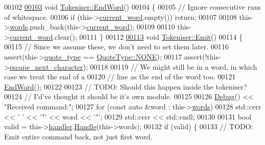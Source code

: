 \begin{DoxyCode}
00102 
\hypertarget{tokeniser_8cpp_source_l00103}{}\hyperlink{classTokeniser_abb18309e5b6cce8fc63cdb4b02e69bf3}{00103} \textcolor{keywordtype}{void} \hyperlink{classTokeniser_abb18309e5b6cce8fc63cdb4b02e69bf3}{Tokeniser::EndWord}()
00104 \{
00105     \textcolor{comment}{// Ignore consecutive runs of whitespace.}
00106     \textcolor{keywordflow}{if} (this->\hyperlink{classTokeniser_a5d703e64476ccc8cbf42cc7c3ef8bc79}{current\_word}.empty()) \textcolor{keywordflow}{return};
00107 
00108     this->\hyperlink{classTokeniser_ac87e935ecd591ec802e223ec341ebbfb}{words}.push\_back(this->\hyperlink{classTokeniser_a5d703e64476ccc8cbf42cc7c3ef8bc79}{current\_word});
00109 
00110     this->\hyperlink{classTokeniser_a5d703e64476ccc8cbf42cc7c3ef8bc79}{current\_word}.clear();
00111 \}
00112 
\hypertarget{tokeniser_8cpp_source_l00113}{}\hyperlink{classTokeniser_a71405521b0e9c00a0d9b1a2f32ae10c2}{00113} \textcolor{keywordtype}{void} \hyperlink{classTokeniser_a71405521b0e9c00a0d9b1a2f32ae10c2}{Tokeniser::Emit}()
00114 \{
00115     \textcolor{comment}{// Since we assume these, we don't need to set them later.}
00116     assert(this->\hyperlink{classTokeniser_a10b7147e055edd438fcb951fc41faf65}{quote\_type} == \hyperlink{classTokeniser_a71d622e60fae9d6c36c96ba69a4f62e4ab50339a10e1de285ac99d4c3990b8693}{QuoteType::NONE});
00117     assert(!this->\hyperlink{classTokeniser_ace181afc0f1425b87126becc79458edd}{escape\_next\_character});
00118 
00119     \textcolor{comment}{// We might still be in a word, in which case we treat the end of a}
00120     \textcolor{comment}{// line as the end of the word too.}
00121     \hyperlink{classTokeniser_abb18309e5b6cce8fc63cdb4b02e69bf3}{EndWord}();
00122 
00123     \textcolor{comment}{// TODO: Should this happen inside the tokeniser?}
00124     \textcolor{comment}{// I'd've thought it should be it's own module.}
00125 
00126     \hyperlink{classDebug}{Debug}() << \textcolor{stringliteral}{"Received command:"};
00127     \textcolor{keywordflow}{for} (\textcolor{keyword}{const} \textcolor{keyword}{auto} &word : this->\hyperlink{classTokeniser_ac87e935ecd591ec802e223ec341ebbfb}{words})
00128         std::cerr << \textcolor{charliteral}{' '} << \textcolor{charliteral}{'"'} << word << \textcolor{charliteral}{'"'};
00129     std::cerr << std::endl;
00130 
00131     \textcolor{keywordtype}{bool} valid = this->\hyperlink{classTokeniser_a779dcc74539e27d10b7d2118fae996e6}{handler}.\hyperlink{classCommandHandler_abc1ad0dfbff50db168d0a65cf05b169e}{Handle}(this->words);
00132     \textcolor{keywordflow}{if} (valid) \{
00133         \textcolor{comment}{// TODO: Emit entire command back, not just first word.}

\end{DoxyCode}
